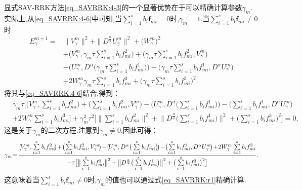 显式SAV-RRK方法\eqref{eq_SAVRRK:4-3}的一个显著优势在于可以精确计算参数$\gamma_m$.
实际上,从\eqref{eq_SAVRRK:4-6}中可知,当$\sum\limits_{i=1}^s b_i \bm{f}_{m i}=0$时,$\gamma_m=1$.当$\sum\limits_{i=1}^s b_i \bm{f}_{m i}\neq 0$时%
\begin{align}
E_{\gamma}^{m+1}  = & \|V_{\gamma}^{m}\|^2+\|D^\frac{\alpha}{2} U_{\gamma}^{m}\|^2+\big(W_{\gamma}^{m}\big)^2 \nonumber\\
& + \big(V_{\gamma}^{m},\gamma_m\tau\sum\limits_{i=1}^{s}b_if_{mi}^2\big)+\big(\gamma_m\tau\sum\limits_{i=1}^{s}b_if_{mi}^2,V_{\gamma}^{m}\big)\nonumber\\
&-\big(U_{\gamma}^{m}, D^{\alpha}\big(\gamma_m\tau\sum\limits_{i=1}^{s}b_if_{mi}^1\big)\big)-\big(\gamma_m\tau\sum\limits_{i=1}^{s}b_if_{mi}^1, D^{\alpha} U_{\gamma}^{m}\big)\nonumber\\
&+2W_{\gamma}^{m}\gamma_m\tau\sum\limits_{i=1}^{s}b_if_{mi}^3+\big(\gamma_m\tau\sum\limits_{i=1}^{s}b_if_{mi}^3\big)^2.\label{eq_SAVRRK:49}
\end{align}
将其与\eqref{eq_SAVRRK:4-6}结合,得到：
\begin{align*}
&\gamma_m\tau\big[\big(V_{\gamma}^{m},\sum\limits_{i=1}^{s}b_if_{mi}^2\big)+\big(\sum\limits_{i=1}^{s}b_if_{mi}^2,V_{\gamma}^{m}\big)-\big(U_{\gamma}^{m},D^{\alpha}\big(\sum\limits_{i=1}^{s}b_if_{mi}^1\big)\big)-\big(\sum\limits_{i=1}^{s}b_if_{mi}^1, D^{\alpha} U_{\gamma}^{m}\big)\\
&+2W_{\gamma}^{m}\sum\limits_{i=1}^{s}b_if_{mi}^3\big] +\gamma_m^2\tau^2\big[\big\|\sum\limits_{i=1}^{s}b_if_{mi}^2\big\|^2+ \big\|D^\frac{\alpha}{2}\big(\sum\limits_{i=1}^{s}b_if_{mi}^1\big)\big\|^2+\big(\sum\limits_{i=1}^{s}b_if_{mi}^3\big)^2\big]=0,
\end{align*}
这是关于$\gamma_m$的二次方程.注意到$\gamma_m\neq 0$,因此可得：
\begin{equation}\label{eq_SAVRRK:r1}\small
\gamma_m \!=\! \frac{\big(\!V_{\gamma}^{m},\sum\limits_{i=1}^{s}b_if_{mi}^2\!\big)\!+\!\big(\!\sum\limits_{i=1}^{s}b_if_{mi}^2,V_{\gamma}^{m}\!\big)\!-\!\big(\!U_{\gamma}^{m},D^{\alpha}\big(\sum\limits_{i=1}^{s}b_if_{mi}^1\big)\!\big)\!-\!\big(\!\sum\limits_{i=1}^{s}b_if_{mi}^1, D^{\alpha} U_{\gamma}^{m}\!\big)\!+\!2W_{\gamma}^{m}\sum\limits_{i=1}^{s}b_if_{mi}^3}{-\tau\big[\big\|\sum\limits_{i=1}^{s}b_if_{mi}^2\big\|^2+\big\|D^\frac{\alpha}{2}\big(\sum\limits_{i=1}^{s}b_if_{mi}^1\big)\big\|^2+\big(\sum\limits_{i=1}^{s}b_if_{mi}^3\big)^2\big]} .
\end{equation}
这意味着当$\sum\limits_{i=1}^s b_i \bm{f}_{m i}\neq 0$时,$\gamma_m$的值也可以通过式\eqref{eq_SAVRRK:r1}精确计算.


